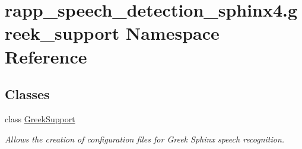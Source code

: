 \hypertarget{namespacerapp__speech__detection__sphinx4_1_1greek__support}{\section{rapp\-\_\-speech\-\_\-detection\-\_\-sphinx4.\-greek\-\_\-support Namespace Reference}
\label{namespacerapp__speech__detection__sphinx4_1_1greek__support}
}
\subsection*{Classes}
\begin{DoxyCompactItemize}
\item 
class \hyperlink{classrapp__speech__detection__sphinx4_1_1greek__support_1_1GreekSupport}{Greek\-Support}
\begin{DoxyCompactList}\small\item\em Allows the creation of configuration files for Greek Sphinx speech recognition. \end{DoxyCompactList}\end{DoxyCompactItemize}

